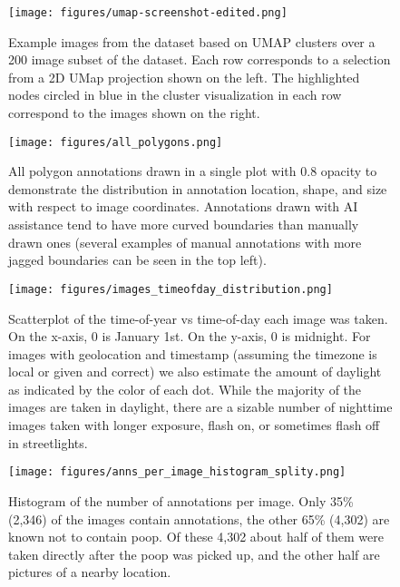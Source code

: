 \documentclass[10pt,twocolumn,letterpaper]{article}
\begin{document}


\begin{figure}[ht]
\centering
\texttt{[image: figures/umap-screenshot-edited.png]}%
\caption[]{
    Example images from the dataset based on UMAP \cite{mcinnes_umap_2020}
    clusters over a 200 image subset of the dataset.  Each row corresponds to a
    selection from a 2D UMap projection shown on the left.  The highlighted
    nodes circled in blue in the cluster visualization in each row correspond
    to the images shown on the right.
}
\label{fig:umap_dataset_viz}
\end{figure}

\begin{figure}[ht]
\centering
\texttt{[image: figures/all\_polygons.png]}
\caption[]{
    All polygon annotations drawn in a single plot with 0.8 opacity to
    demonstrate the distribution in annotation location, shape, and size with
    respect to image coordinates. Annotations drawn with AI
    assistance tend to have more curved boundaries than manually drawn ones
    (several examples of manual annotations with more jagged boundaries can be
    seen in the top left).
}
\label{fig:AllPolygons}
\end{figure}

\begin{figure}[ht]
\centering
\texttt{[image: figures/images\_timeofday\_distribution.png]}
\caption[]{
    Scatterplot of the time-of-year vs time-of-day each image was taken.
    On the x-axis, 0 is January 1st.
    On the y-axis, 0 is midnight.
    For images with geolocation and timestamp (assuming the timezone is local or given and correct) we also
      estimate the amount of daylight as indicated by the color of each dot.
    While the majority of the images are taken in daylight, there are a sizable number of nighttime images taken with longer exposure, flash on, or sometimes flash off in streetlights.
}
\label{fig:TimeOfDayDistribution}
\end{figure}


\begin{figure}[ht]
\centering
\texttt{[image: figures/anns\_per\_image\_histogram\_splity.png]}
\caption[]{
    Histogram of the number of annotations per image. 
    Only 35\% (2,346) of the images contain annotations, the other 65\% (4,302)
    are known not to contain poop. Of these 4,302 about half of them were taken
    directly after the poop was picked up, and the other half are pictures of a
    nearby location.
}
\label{fig:AnnotsPerImage}
\end{figure}
\end{document}
